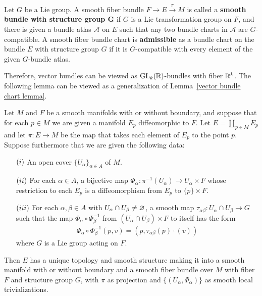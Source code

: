 \begin{definition}
Let $G$ be a Lie group. A smooth fiber bundle $F\to E\stackrel{\pi}{\to}M$ is called a \textbf{smooth bundle with structure group $\bm{G}$} if $G$ is a Lie transformation group on $F$, and there is given 
a bundle atlas $\mathcal{A}$ on $E$ such that any two bundle charts in $\mathcal{A}$ are $G$-compatible. A smooth fiber bundle chart is \textbf{admissible} as a bundle chart on the bundle $E$ with structure group $G$ if it is $G$-compatible with every element of the given $G$-bundle atlas.
\end{definition}
Therefore, vector bundles can be viewed as $\mathrm{GL}_k(\mathbb{R})$-bundles with fiber $\mathbb{R}^k$. The following lemma can be viewed as a generalization of Lemma~\ref{vector bundle chart lemma}.
\begin{lemma}\label{fiber bundle chart lemma}
Let $M$ and $F$ be a smooth manifolds with or without boundary, and suppose that for each $p\in M$ we are given a manifold $E_p$ diffeomorphic to $F$. Let $E=\coprod_{p\in M}E_p$ and let 
$\pi:E\to M$ be the map that takes each element of $E_p$ to the point $p$. Suppose furthermore that we are given the following 
data:
\begin{itemize}
\item[$(\rmnum{1})$] An open cover $\{U_\alpha\}_{\alpha\in A}$ of $M$.
\item[$(\rmnum{2})$] For each $\alpha\in A$, a bijective map $\varPhi_\alpha:\pi^{-1}(U_\alpha)\to U_\alpha\times F$ whose restriction to each $E_p$ is a diffeomorphism from $E_p$ to $\{p\}\times F$.
\item[$(\rmnum{3})$] For each $\alpha,\beta\in A$ with $U_\alpha\cap U_\beta\neq\varnothing$, a smooth map $\tau_{\alpha\beta}:U_\alpha\cap U_\beta\to G$ such that the map $\varPhi_\alpha\circ\varPhi_\beta^{-1}$ from $(U_\alpha\cap U_\beta)\times F$ to itself has the form
\begin{align}\label{fiber bundle transition function-1}
\varPhi_\alpha\circ\varPhi_\beta^{-1}(p,v)=(p,\tau_{\alpha\beta}(p)\cdot(v))
\end{align}
where $G$ is a Lie group acting on $F$.
\end{itemize}
Then $E$ has a unique topology and smooth structure making it into a smooth manifold with or without boundary and a smooth fiber bundle over $M$ with fiber $F$ and structure group $G$, with $\pi$
as projection and $\{(U_\alpha,\varPhi_\alpha)\}$ as smooth local trivializations.
\end{lemma}
